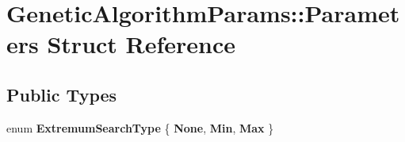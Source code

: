 \hypertarget{struct_genetic_algorithm_params_1_1_parameters}{}\section{Genetic\+Algorithm\+Params\+:\+:Parameters Struct Reference}
\label{struct_genetic_algorithm_params_1_1_parameters}
\subsection*{Public Types}
\begin{DoxyCompactItemize}
\item 
\mbox{\label{struct_genetic_algorithm_params_1_1_parameters_a4abcc00278515e339ac9cef36b07c14a}} 
enum {\bfseries Extremum\+Search\+Type} \{ {\bfseries None}, 
{\bfseries Min}, 
{\bfseries Max}
 \}
\end{DoxyCompactItemize}
